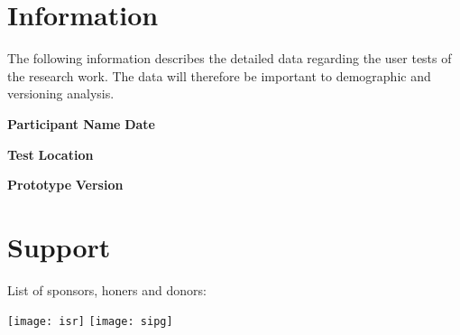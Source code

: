 
\section*{Information}

The following information describes the detailed data regarding the user tests of the research work. The data will therefore be important to demographic and versioning analysis.

\vspace{1cm}

\textbf{Participant Name} \hfill \textbf{Date}

\vspace{2.5cm}

\textbf{Test} \hfill \textbf{Location}

\vspace{2.5cm}

\textbf{Prototype} \hfill \textbf{Version}

\vfill


\section*{Support}

\hfill

List of sponsors, honers and donors:

\hfill


\hfill

\texttt{[image: isr]} \hfill \texttt{[image: sipg]} \hfill

\hfill

